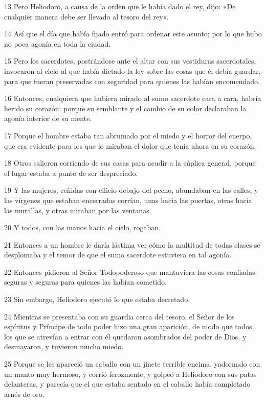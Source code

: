 \par 13 Pero Heliodoro, a causa de la orden que le había dado el rey, dijo: «De cualquier manera debe ser llevado al tesoro del rey».
\par 14 Así que el día que había fijado entró para ordenar este asunto; por lo que hubo no poca agonía en toda la ciudad.
\par 15 Pero los sacerdotes, postrándose ante el altar con sus vestiduras sacerdotales, invocaron al cielo al que había dictado la ley sobre las cosas que él debía guardar, para que fueran preservadas con seguridad para quienes las habían encomendado.
\par 16 Entonces, cualquiera que hubiera mirado al sumo sacerdote cara a cara, habría herido su corazón: porque su semblante y el cambio de su color declaraban la agonía interior de su mente.
\par 17 Porque el hombre estaba tan abrumado por el miedo y el horror del cuerpo, que era evidente para los que lo miraban el dolor que tenía ahora en su corazón.
\par 18 Otros salieron corriendo de sus casas para acudir a la súplica general, porque el lugar estaba a punto de ser despreciado.
\par 19 Y las mujeres, ceñidas con cilicio debajo del pecho, abundaban en las calles, y las vírgenes que estaban encerradas corrían, unas hacia las puertas, otras hacia las murallas, y otras miraban por las ventanas.
\par 20 Y todos, con las manos hacia el cielo, rogaban.
\par 21 Entonces a un hombre le daría lástima ver cómo la multitud de todas clases se desplomaba y el temor de que el sumo sacerdote estuviera en tal agonía.
\par 22 Entonces pidieron al Señor Todopoderoso que mantuviera las cosas confiadas seguras y seguras para quienes las habían cometido.
\par 23 Sin embargo, Heliodoro ejecutó lo que estaba decretado.
\par 24 Mientras se presentaba con su guardia cerca del tesoro, el Señor de los espíritus y Príncipe de todo poder hizo una gran aparición, de modo que todos los que se atrevían a entrar con él quedaron asombrados del poder de Dios, y desmayaron, y tuvieron mucho miedo.
\par 25 Porque se les apareció un caballo con un jinete terrible encima, y ​​adornado con un manto muy hermoso, y corrió ferozmente, y golpeó a Heliodoro con sus patas delanteras, y parecía que el que estaba sentado en el caballo había completado arnés de oro.
